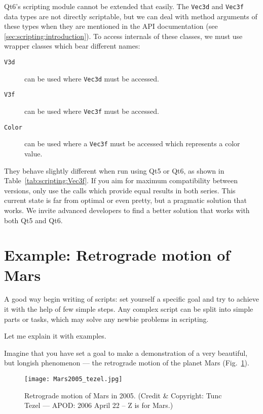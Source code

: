 Qt6's scripting module cannot be extended that easily. The \texttt{Vec3d} and \texttt{Vec3f} data types are not directly scriptable, 
but we can deal with method arguments of these types when they are mentioned in the API documentation (see \ref{sec:scripting:introduction}). 
To access internals of these classes, we must use wrapper classes which bear different names:
\begin{description}
\item[\texttt{V3d}] can be used where \texttt{Vec3d} must be accessed.
\item[\texttt{V3f}] can be used where \texttt{Vec3f} must be accessed.
\item[\texttt{Color}] can be used where a \texttt{Vec3f} must be accessed which represents a color value.
\end{description}

They behave slightly different when run using Qt5 or Qt6, as shown in Table~\ref{tab:scripting:Vec3f}. If you aim for maximum compatibility between versions, 
only use the calls which provide equal results in both series. This current state is far from optimal or even pretty, but a pragmatic solution that works. 
We invite advanced developers to find a better solution that works with both Qt5 and Qt6.


\section{Example: Retrograde motion of Mars}
\label{sec:scripting:RetrogradeMotionOfMars}
A good way begin writing of scripts: set yourself a specific
goal and try to achieve it with the help of few simple steps. Any
complex script can be split into simple parts or tasks, which may solve any
newbie problems in scripting.

Let me explain it with examples.

Imagine that you have set a goal to make a demonstration of a  very
beautiful, but longish phenomenon --- the retrograde motion of the
planet Mars (Fig.~\ref{fig:Mars2005}).

\begin{figure}[tb]
\centering\texttt{[image: Mars2005\_tezel.jpg]}
\caption{Retrograde motion of Mars in 2005. {\small(Credit \& Copyright: Tunc Tezel --- APOD: 2006 April 22 -- Z is for Mars.)}}
\label{fig:Mars2005}
\end{figure}

